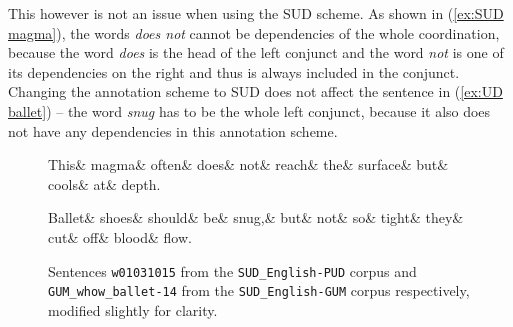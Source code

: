 This however is not an issue when using the SUD scheme. As shown in (\ref{ex:SUD magma}), the words \textsl{does not} cannot be dependencies of the whole coordination, because the word \textsl{does} is the head of the left conjunct and the word \textsl{not} is one of its dependencies on the right and thus is always included in the conjunct. Changing the annotation scheme to SUD does not affect the sentence in (\ref{ex:UD ballet}) -- the word \textsl{snug} has to be the whole left conjunct, because it also does not have any dependencies in this annotation scheme.

\begin{figure}
\begin{exe}
    \ex
    \label{ex:SUD magma}
    \begin{dependency}[hide label, baseline=-\the\dimexpr\fontdimen22\textfont2\relax]
	\begin{deptext}
		 This\& magma\& often\& does\& not\& reach\& the\& surface\& but\& cools\& at\& depth.\\
	 \end{deptext} 
\end{dependency}
\end{exe}

\begin{exe}
    \ex
    \label{ex:SUD ballet}
    \begin{dependency}[hide label, baseline=-\the\dimexpr\fontdimen22\textfont2\relax]
        \begin{deptext}
            Ballet\& shoes\& should\& be\& snug,\& but\& not\& so\& tight\& they\& cut\& off\& blood\& flow.\\
        \end{deptext}
    \end{dependency}
\end{exe}
\caption{Sentences \texttt{w01031015} from the \texttt{SUD\_English-PUD} corpus and \texttt{GUM\_whow\_ballet-14} from the \texttt{SUD\_English-GUM} corpus respectively, modified slightly for clarity.}
\end{figure}

